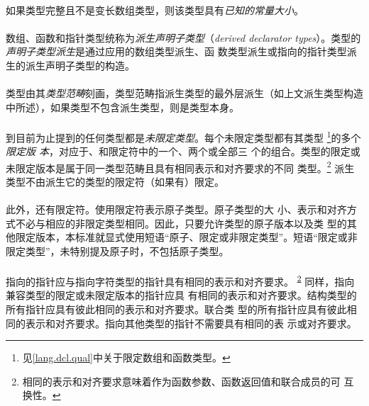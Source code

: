 {\paragraph{}
如果类型完整且不是变长数组类型，则该类型具有\textit{已知的常量大小}。

\paragraph{}
数组、函数和指针类型统称为\textit{派生声明子类型}（\textit{derived declarator
types}）。类型的\textit{声明子类型派生}是通过应用的数组类型派生、函
数类型派生或指向的指针类型派生的派生声明子类型的构造。

\paragraph{}
类型由其\textit{类型范畴}刻画，类型范畴指派生类型的最外层派生（如上文派生类型构造
中所述），如果类型不包含派生类型，则是类型本身。

\paragraph{}
到目前为止提到的任何类型都是\textit{未限定类型}。每个未限定类型都有其类型
\footnote{见\ref{lang.dcl.qual}中关于限定数组和函数类型。}的多个\textit{限定版
本}，对应于、和限定符中的一个、两个或全部三
个的组合。类型的限定或未限定版本是属于同一类型范畴且具有相同表示和对齐要求的不同
类型。\footnote{相同的表示和对齐要求意味着作为函数参数、函数返回值和联合成员的可
互换性。\label{interchg}} 派生类型不由派生它的类型的限定符（如果有）限定。

\paragraph{}
此外，还有限定符。使用限定符表示原子类型。原子类型的大
小、表示和对齐方式不必与相应的非限定类型相同。因此，只要允许类型的原子版本以及类
型的其他限定版本，本标准就显式使用短语``原子、限定或非限定类型''。短语``限定或非
限定类型''，未特别提及原子时，不包括原子类型。

\paragraph{}
指向的指针应与指向字符类型的指针具有相同的表示和对齐要求。
\textsuperscript{\ref{interchg}} 同样，指向兼容类型的限定或未限定版本的指针应具
有相同的表示和对齐要求。结构类型的所有指针应具有彼此相同的表示和对齐要求。联合类
型的所有指针应具有彼此相同的表示和对齐要求。指向其他类型的指针不需要具有相同的表
示或对齐要求。

}
